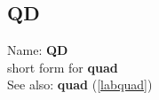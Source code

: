 \subsection{QD}
\label{labqd}
\noindent Name: \textbf{QD}\\
short form for \textbf{quad}\\
See also: \textbf{quad} (\ref{labquad})
